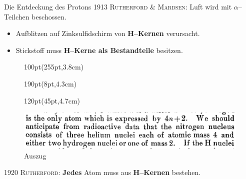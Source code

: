 \documentclass[t,9pt]{beamer}
\newcommand{\highlight}[3]{ \begin{textblock*}{#1}(#2,#3) \begin{tcolorbox} [enhanced,opacityfill=.1,colback=blue] \end{tcolorbox} \end{textblock*} } %
\begin{document}
        \begin{frame}{Die Entdeckung des Protons}
                1913 \textsc{Rutherford \& \textsc{Mardsen}}: Luft wird mit $\alpha $--Teilchen beschossen.
                \begin{itemize}
                        \item Aufblitzen auf Zinksulfidschirm von \textbf{H--Kernen} verursacht.
                        \item Stickstoff muss \textbf{H--Kerne als Bestandteile} besitzen.
                \end{itemize}
                \begin{figure}
                        \highlight{100pt}{255pt}{3.8cm}
                        \highlight{190pt}{8pt}{4.3cm}
                        \highlight{120pt}{45pt}{4.7cm}
                        \includegraphics[width=\textwidth]{prosi_nitrogen_made_of_H.png}
                        \caption*{Auszug \cite{Rutherford1919}}
                \end{figure}
                \vspace{.5cm}1920 \textsc{Rutherford}: \textbf{Jedes} Atom muss aus \textbf{H--Kernen} bestehen.\cite{Rutherford_proton_discovery}
        \end{frame}

\end{document}
